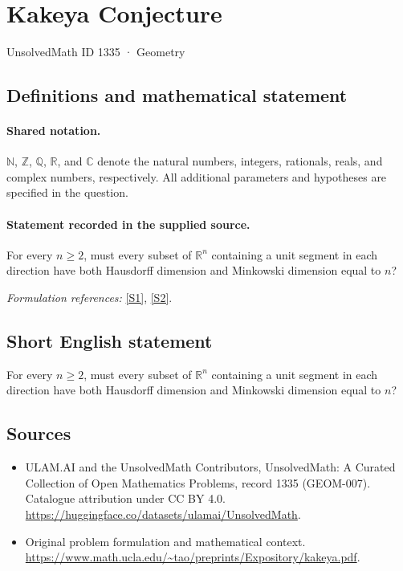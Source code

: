 \documentclass[11pt]{article}
\newcommand{\sref}[2]{\hyperlink{source:#1:#2}{[S#2]}}
\begin{document}
\setcounter{section}{1334}
\section{Kakeya Conjecture}\label{1335}
{\small UnsolvedMath ID 1335 · Geometry}
\subsection{Definitions and mathematical statement}

\paragraph{Shared notation.}$\mathbb N$, $\mathbb Z$, $\mathbb Q$, $\mathbb R$, and $\mathbb C$ denote the natural numbers, integers, rationals, reals, and complex numbers, respectively. All additional parameters and hypotheses are specified in the question.


\paragraph{Statement recorded in the supplied source.}
For every $n\geq2$, must every subset of $\mathbb R^n$ containing a unit segment in each direction have both Hausdorff dimension and Minkowski dimension equal to $n$?
\par\smallskip\textit{Formulation references:} \sref{1335}{1}, \sref{1335}{2}.
\subsection{Short English statement}
For every $n\geq2$, must every subset of $\mathbb R^n$ containing a unit segment in each direction have both Hausdorff dimension and Minkowski dimension equal to $n$?
\subsection{Sources}
\begin{itemize}
\item[\hypertarget{source:1335:1}{S1}] ULAM.AI and the UnsolvedMath Contributors, UnsolvedMath: A Curated Collection of Open Mathematics Problems, record 1335 (GEOM-007). Catalogue attribution under CC BY 4.0.
\url{https://huggingface.co/datasets/ulamai/UnsolvedMath}.
\item[\hypertarget{source:1335:2}{S2}] Original problem formulation and mathematical context.
\url{https://www.math.ucla.edu/~tao/preprints/Expository/kakeya.pdf}.
\end{itemize}
\label{end:1335}
\end{document}
